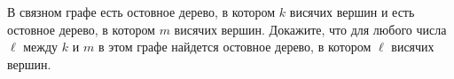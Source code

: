 В связном графе есть остовное дерево, в котором $k$ висячих вершин и есть остовное дерево, в котором $m$ висячих
вершин. Докажите, что для любого числа $\ell$ между $k$ и $m$ в этом графе найдется остовное дерево, в котором $\ell$ висячих
вершин.